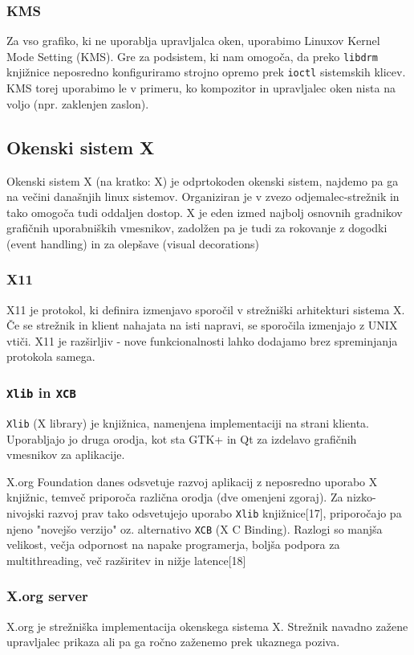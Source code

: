 \documentclass{article}
\begin{document}
\subsubsection{KMS}
Za vso grafiko, ki ne uporablja upravljalca oken, uporabimo Linuxov Kernel Mode Setting (KMS). Gre za podsistem, ki nam omogoča, da preko \lstinline{libdrm} knjižnice neposredno konfiguriramo strojno opremo prek \lstinline{ioctl} sistemskih klicev. KMS torej uporabimo le v primeru, ko kompozitor in upravljalec oken nista na voljo (npr. zaklenjen zaslon).

\subsection{Okenski sistem X}
Okenski sistem X (na kratko: X) je odprtokoden okenski sistem, najdemo pa ga na večini današnjih linux sistemov. Organiziran je v zvezo odjemalec-strežnik in tako omogoča tudi oddaljen dostop.
X je eden izmed najbolj osnovnih gradnikov grafičnih uporabniških vmesnikov, zadolžen pa je tudi za rokovanje z dogodki (event handling) in za olepšave (visual decorations)

\subsubsection{X11}
X11 je protokol, ki definira izmenjavo sporočil v strežniški arhitekturi sistema X. Če se strežnik in klient nahajata na isti napravi, se sporočila izmenjajo z UNIX vtiči.
X11 je razširljiv - nove funkcionalnosti lahko dodajamo brez spreminjanja protokola samega.

\subsubsection{\lstinline{Xlib} in \lstinline{XCB}}
\lstinline{Xlib} (X library) je knjižnica, namenjena implementaciji na strani klienta. Uporabljajo jo druga orodja, kot sta GTK+ in Qt za izdelavo grafičnih vmesnikov za aplikacije.

X.org Foundation danes odsvetuje razvoj aplikacij z neposredno uporabo X knjižnic, temveč priporoča različna orodja (dve omenjeni zgoraj). Za nizko-nivojski razvoj prav tako odsvetujejo uporabo \lstinline{Xlib} knjižnice[17], priporočajo pa njeno "novejšo verzijo" oz. alternativo \lstinline{XCB} (X C Binding). Razlogi so manjša velikost, večja odpornost na napake programerja, boljša podpora za multithreading, več razširitev in nižje latence[18]

\subsubsection{X.org server}
X.org je strežniška implementacija okenskega sistema X. Strežnik navadno zažene upravljalec prikaza ali pa ga ročno zaženemo prek ukaznega poziva.
\end{document}
